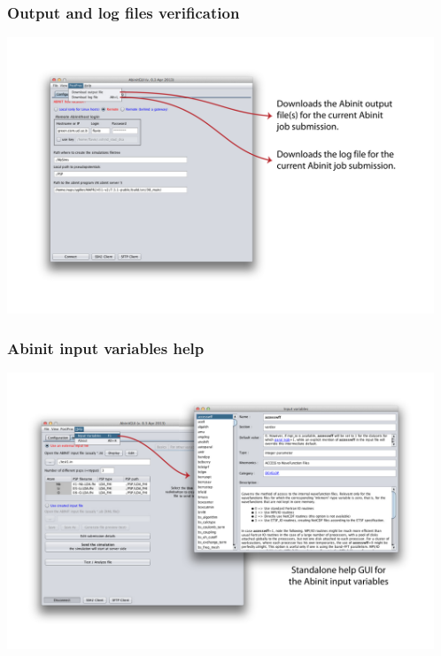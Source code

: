 \begin{frame}
 \frametitle{Output and log files verification}
 \centering
 \includegraphics[height=8.25cm]{menu3}
\end{frame}


\begin{frame}
 \frametitle{Abinit input variables help}
 \centering
 \includegraphics[height=8.25cm]{f3_bis}
\end{frame}


